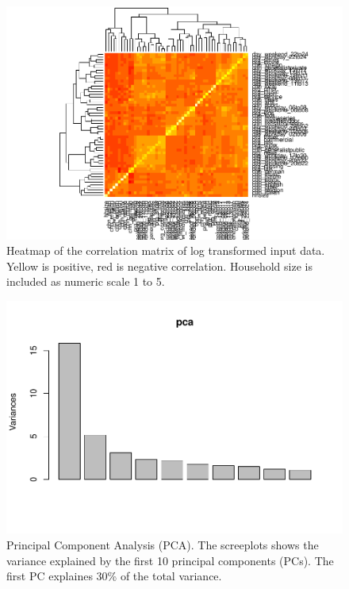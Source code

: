 \documentclass[]{article}
\begin{document}
\pagebreak

\begin{figure}
\centering
\includegraphics{Diploma_files/figure-latex/unnamed-chunk-25-1.pdf}
\caption{\label{fig:fig5} Heatmap of the correlation matrix of log
transformed input data. Yellow is positive, red is negative correlation.
Household size is included as numeric scale 1 to 5.}
\end{figure}

\pagebreak

\begin{figure}
\centering
\includegraphics{Diploma_files/figure-latex/unnamed-chunk-26-1.pdf}
\caption{\label{fig:fig6} Principal Component Analysis (PCA). The
screeplots shows the variance explained by the first 10 principal
components (PCs). The first PC explaines 30\% of the total variance.}
\end{figure}
\end{document}
